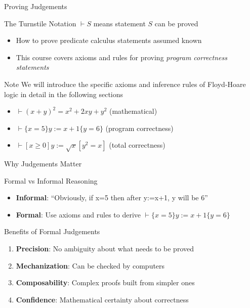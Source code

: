 \begin{frame}{Proving Judgements}
    \begin{block}{The Turnstile Notation}
        $\vdash S$ means statement $S$ can be proved
        \begin{itemize}
            \item How to prove predicate calculus statements assumed known
            \item This course covers axioms and rules for proving \emph{program correctness statements}
        \end{itemize}
    \end{block}
    
    \begin{alertblock}{Note}
        We will introduce the specific axioms and inference rules of Floyd-Hoare logic in detail in the following sections
    \end{alertblock}
    
    \begin{example}
        \begin{itemize}
            \item $\vdash (x + y)^2 = x^2 + 2xy + y^2$ (mathematical)
            \item $\vdash \{x = 5\} y := x + 1 \{y = 6\}$ (program correctness)
            \item $\vdash [x \geq 0] y := \sqrt{x} [y^2 = x]$ (total correctness)
        \end{itemize}
    \end{example}
\end{frame}

\begin{frame}{Why Judgements Matter}
    \begin{block}{Formal vs Informal Reasoning}
        \begin{itemize}
            \item \textbf{Informal}: ``Obviously, if x=5 then after y:=x+1, y will be 6''
            \item \textbf{Formal}: Use axioms and rules to derive $\vdash \{x = 5\} y := x + 1 \{y = 6\}$
        \end{itemize}
    \end{block}
    
    \begin{block}{Benefits of Formal Judgements}
        \begin{enumerate}
            \item \textbf{Precision}: No ambiguity about what needs to be proved
            \item \textbf{Mechanization}: Can be checked by computers
            \item \textbf{Composability}: Complex proofs built from simpler ones
            \item \textbf{Confidence}: Mathematical certainty about correctness
        \end{enumerate}
    \end{block}
\end{frame}

